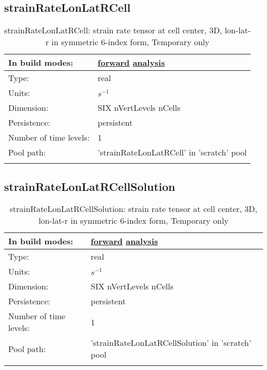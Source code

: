 \subsection[strainRateLonLatRCell]{strainRateLonLatRCell}
\label{subsec:var_sec_scratch_strainRateLonLatRCell}
\begin{center}
\begin{longtable}{| p{2.0in} | p{4.0in} |}
        \hline 
        In build modes: & \hyperref[subsec:forward_var_tab_scratch]{forward} \hyperref[subsec:analysis_var_tab_scratch]{analysis} \\
        \hline 
        Type: & real \\
        \hline 
        Units: & $s^{-1}$ \\
        \hline 
        Dimension: & SIX nVertLevels nCells \\
        \hline 
        Persistence: & persistent \\
        \hline 
        Number of time levels: & 1 \\
        \hline 
            Pool path: & 'strainRateLonLatRCell' in 'scratch' pool
 \\
		 \hline 
    \caption{strainRateLonLatRCell: strain rate tensor at cell center, 3D, lon-lat-r in symmetric 6-index form, {\color{red}Temporary only}}
\end{longtable}
\end{center}
\subsection[strainRateLonLatRCellSolution]{strainRateLonLatRCellSolution}
\label{subsec:var_sec_scratch_strainRateLonLatRCellSolution}
\begin{center}
\begin{longtable}{| p{2.0in} | p{4.0in} |}
        \hline 
        In build modes: & \hyperref[subsec:forward_var_tab_scratch]{forward} \hyperref[subsec:analysis_var_tab_scratch]{analysis} \\
        \hline 
        Type: & real \\
        \hline 
        Units: & $s^{-1}$ \\
        \hline 
        Dimension: & SIX nVertLevels nCells \\
        \hline 
        Persistence: & persistent \\
        \hline 
        Number of time levels: & 1 \\
        \hline 
            Pool path: & 'strainRateLonLatRCellSolution' in 'scratch' pool
 \\
		 \hline 
    \caption{strainRateLonLatRCellSolution: strain rate tensor at cell center, 3D, lon-lat-r in symmetric 6-index form, {\color{red}Temporary only}}
\end{longtable}
\end{center}
